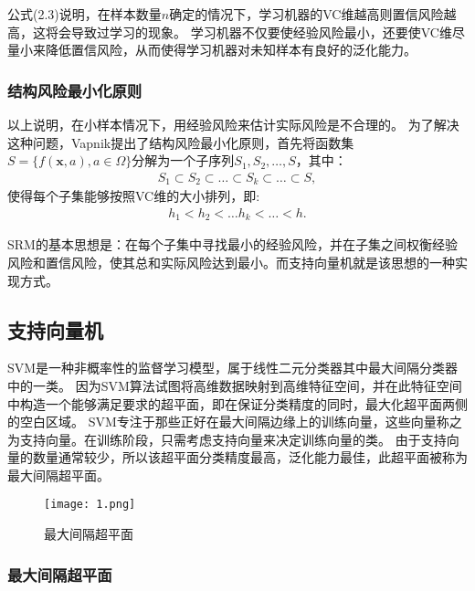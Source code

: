 公式(2.3)说明，在样本数量$n$确定的情况下，学习机器的VC维越高则置信风险越高，这将会导致过学习的现象。
学习机器不仅要使经验风险最小，还要使VC维尽量小来降低置信风险，从而使得学习机器对未知样本有良好的泛化能力。

\subsubsection{结构风险最小化原则}

以上说明，在小样本情况下，用经验风险来估计实际风险是不合理的。
为了解决这种问题，Vapnik提出了结构风险最小化原则，首先将函数集$S=\{f(\mathbf{x},a),a\in\Omega\}$分解为一个子序列$S_1, S_2, \ldots , S$，其中：
\begin{align}
    S_1\subset S_2\subset \ldots \subset S_k\subset \ldots \subset S,
\end{align}
使得每个子集能够按照VC维的大小排列，即:
\begin{align}
    h_1 < h_2 < \ldots h_k < \ldots < h.
\end{align}

SRM的基本思想是：在每个子集中寻找最小的经验风险，并在子集之间权衡经验风险和置信风险，使其总和实际风险达到最小。而支持向量机就是该思想的一种实现方式。

\subsection{支持向量机}

SVM是一种非概率性的监督学习模型，属于线性二元分类器其中最大间隔分类器中的一类。
因为SVM算法试图将高维数据映射到高维特征空间，并在此特征空间中构造一个能够满足要求的超平面，即在保证分类精度的同时，最大化超平面两侧的空白区域。
SVM专注于那些正好在最大间隔边缘上的训练向量，这些向量称之为支持向量。在训练阶段，只需考虑支持向量来决定训练向量的类。
由于支持向量的数量通常较少，所以该超平面分类精度最高，泛化能力最佳，此超平面被称为最大间隔超平面。

\begin{figure}[ht]
    \centering
    \texttt{[image: 1.png]}
    \caption{最大间隔超平面}
\end{figure}

\subsubsection{最大间隔超平面}

